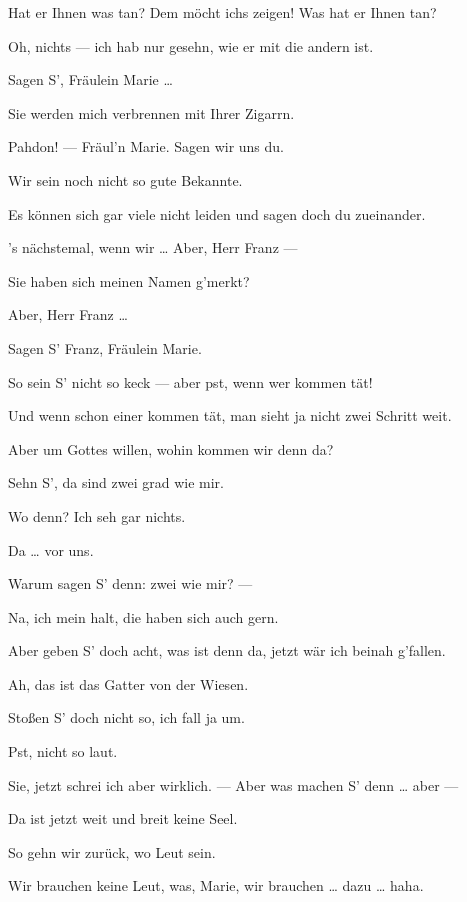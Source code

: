 \documentclass[
	final,
	a4paper,
	ngerman,
	mpinclude = true, %
	twoside = true,
	open = right,
	cleardoublepage = plain,
	DIV = 13,
	BCOR = 1cm,
	titlepage = firstiscover,
	]{scrbook}
\newcommand{\thecharacter}[1]{\textup{\textsc{#1}}\xspace}
\newcommand{\thesoldat}{\thecharacter{Soldatin}}
\newcommand{\thepraktikant}{\thecharacter{Praktikant}}
\newcommand{\character}[1]{\item[#1:]}
\newcommand{\soldat}{\character{\thesoldat}}
\newcommand{\praktikant}{\character{\thepraktikant}}
\begin{document}
\begin{play}
	\soldat
	Hat er Ihnen was tan? Dem möcht ichs zeigen! Was hat er Ihnen tan?

	\praktikant
	Oh, nichts --- ich hab nur gesehn, wie er mit die andern ist.

	\soldat
	Sagen S', Fräulein Marie \ldots{}

	\praktikant
	Sie werden mich verbrennen mit Ihrer Zigarrn.

	\soldat
	Pahdon! --- Fräul'n Marie. Sagen wir uns du.

	\praktikant
	Wir sein noch nicht so gute Bekannte.

	\soldat
	Es können sich gar viele nicht leiden und sagen doch du zueinander.

	\praktikant
	's nächstemal, wenn wir \ldots{} Aber, Herr Franz ---

	\soldat
	Sie haben sich meinen Namen g'merkt?

	\praktikant
	Aber, Herr Franz \ldots{}

	\soldat
	Sagen S' Franz, Fräulein Marie.

	\praktikant
	So sein S' nicht so keck --- aber pst, wenn wer kommen tät!

	\soldat
	Und wenn schon einer kommen tät, man sieht ja nicht zwei Schritt weit.

	\praktikant
	Aber um Gottes willen, wohin kommen wir denn da?

	\soldat
	Sehn S', da sind zwei grad wie mir.

	\praktikant
	Wo denn? Ich seh gar nichts.

	\soldat
	Da \ldots{} vor uns.

	\praktikant
	Warum sagen S' denn: zwei wie mir? ---

	\soldat
	Na, ich mein halt, die haben sich auch gern.

	\praktikant
	Aber geben S' doch acht, was ist denn da, jetzt wär ich beinah g'fallen.

	\soldat
	Ah, das ist das Gatter von der Wiesen.

	\praktikant
	Stoßen S' doch nicht so, ich fall ja um.

	\soldat
	Pst, nicht so laut.

	\praktikant
	Sie, jetzt schrei ich aber wirklich. --- Aber was machen S' denn \ldots{} aber ---

	\soldat
	Da ist jetzt weit und breit keine Seel.

	\praktikant
	So gehn wir zurück, wo Leut sein.

	\soldat
	Wir brauchen keine Leut, was, Marie, wir brauchen \ldots{} dazu \ldots{} haha.


\end{play}
\end{document}
